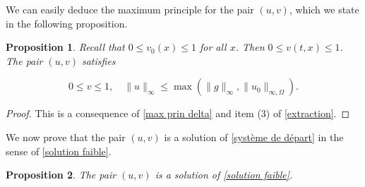 \documentclass[reqno,12pt,twoside]{amsart}
\newtheorem{proposition}{Proposition}[section]
\numberwithin{equation}{section} \numberwithin{theorem}{section}
\numberwithin{proposition}{section} \numberwithin{lemma}{section}
\numberwithin{corollary}{section}
\numberwithin{definition}{section} \numberwithin{remark}{section}
\begin{document}
We can easily deduce the maximum principle for the pair $(u,v)$, which we state in the following proposition. 

\begin{proposition}\label{Maximum principle vrai}
Recall that $0 \leqslant v_0(x) \leqslant 1$ for all $x$. Then $0 \leqslant v(t,x) \leqslant 1$.
The pair $(u,v)$ satisfies 

\[0\leqslant v\leqslant 1, \quad \|u\|_\infty \leqslant \max(\|g\|_\infty, \|u_0\|_{\infty,\Omega}).\]
\end{proposition}

\begin{proof}
This is a consequence of \eqref{max prin delta} and item (3) of \autoref{extraction}. 
\end{proof}

We now prove that the pair $(u,v)$ is a solution of \eqref{système de départ} in the sense of \autoref{solution faible}.  

\begin{proposition}
The pair $(u,v)$ is a solution of \eqref{solution faible}. 
\end{proposition}
\end{document}
